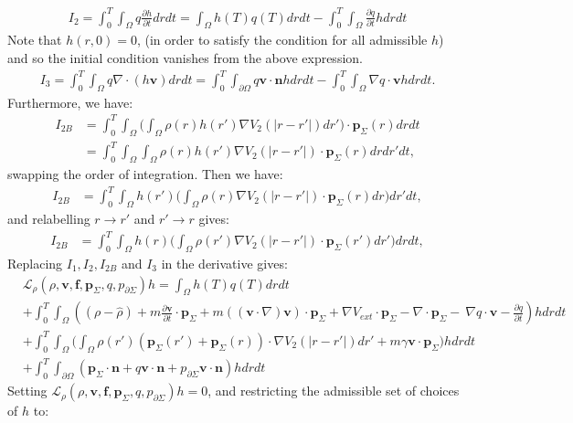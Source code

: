 \documentclass[11pt, a4paper]{article}
\newcommand{\Sta}{\rho}
\newcommand{\Stav}{\mathbf{v}}
\newcommand{\Adja}{\mathbf{p}_\Sigma}
\newcommand{\Adjb}{q}
\newcommand{\Adjc}{p_{\partial \Sigma}}
\newcommand{\Con}{\mathbf{f}}
\theoremstyle{definition}
\begin{document}
\begin{align*}
I_2 = \int_0^T \int_\Omega \Adjb\frac{\partial h}{\partial t} dr dt = \int_\Omega h(T) \Adjb(T) dr dt - \int_0^T \int_\Omega  \frac{\partial \Adjb}{\partial t}h dr dt
\end{align*}
Note that ${h}(r,0)=0$, (in order to satisfy the condition for all admissible ${h}$) and so the initial condition vanishes from the above expression.
\begin{align*}
I_3= \int_0^T \int_\Omega \Adjb\nabla \cdot (h \Stav) dr dt = \int_0^T \int_{\partial \Omega} \Adjb \Stav \cdot \mathbf{n} h dr dt - \int_0^T \int_\Omega \nabla \Adjb \cdot \Stav h dr dt.
\end{align*}
Furthermore, we have:
\begin{align*}
I_{2B}&= \int_0^T \int_\Omega \bigg(\int_\Omega \rho(r) h(r') \nabla V_2(|r-r'|)dr'\bigg) \cdot \Adja(r) drdt\\
&=\int_0^T \int_\Omega \int_\Omega \rho(r) h(r') \nabla V_2(|r-r'|) \cdot \Adja(r) drdr'dt,
\end{align*}
swapping the order of integration. Then we have:
\begin{align*}
I_{2B}&= \int_0^T \int_\Omega  h(r')\bigg(\int_\Omega  \rho(r)\nabla V_2(|r-r'|) \cdot \Adja(r) dr \bigg)dr'dt,
\end{align*}
and relabelling $r \to r'$ and $r' \to r$ gives:
\begin{align*}
I_{2B}&= \int_0^T \int_\Omega  h(r)\bigg(\int_\Omega  \rho(r')\nabla V_2(|r-r'|) \cdot \Adja(r') dr' \bigg)drdt,
\end{align*}
Replacing $I_1, I_2, I_{2B}$ and $I_3$ in the derivative gives:
\begin{align*}
&\mathcal{L}_\Sta(\Sta,\Stav,\Con,\Adja,\Adjb,\Adjc)h = \int_\Omega h(T) \Adjb(T) dr dt  \\
&+ \int_0^T \int_\Omega ( (\Sta - \hat \Sta) +m  \frac{\partial \Stav}{\partial t}\cdot \Adja + m  ((\Stav \cdot \nabla)\Stav )\cdot \Adja+ \nabla V_{ext}\cdot \Adja -\nabla\cdot \Adja  - \ \nabla \Adjb \cdot \Stav  -  \frac{\partial \Adjb}{\partial t}) h dr dt \\
&+ \int_0^T \int_\Omega  \bigg(\int_\Omega  \rho(r')(\Adja(r') + \Adja(r)) \cdot\nabla V_2(|r-r'|)   dr' + m \gamma \Stav \cdot \Adja \bigg)hdr dt\\
&+\int_0^T \int_{\partial \Omega} ( \Adja \cdot \mathbf{n}  +  \Adjb \Stav \cdot \mathbf{n}   +\Adjc \Stav \cdot \mathbf{n})h  dr dt
\end{align*}
Setting $\mathcal{L}_\Sta(\Sta,\Stav,\Con,\Adja,\Adjb,\Adjc)h=0$, and restricting the admissible set of choices of $h$ to:
\end{document}
